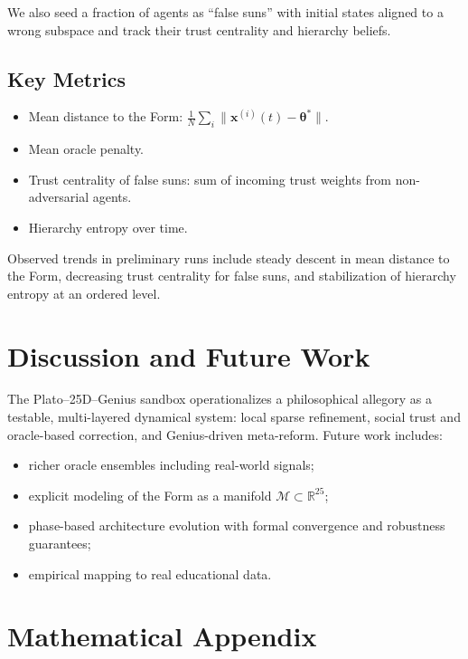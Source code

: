 \documentclass[11pt]{article}
\begin{document}
We also seed a fraction of agents as ``false suns'' with initial states
aligned to a wrong subspace and track their trust centrality and
hierarchy beliefs.

\subsection{Key Metrics}

\begin{itemize}[noitemsep]
  \item Mean distance to the Form:
    \(
      \frac{1}{N}\sum_i \| \bm{x}^{(i)}(t) - \bm{\theta}^* \|.
    \)
  \item Mean oracle penalty.
  \item Trust centrality of false suns:
    sum of incoming trust weights from non-adversarial agents.
  \item Hierarchy entropy over time.
\end{itemize}

Observed trends in preliminary runs include steady descent in mean
distance to the Form, decreasing trust centrality for false suns, and
stabilization of hierarchy entropy at an ordered level.

\section{Discussion and Future Work}

The Plato--25D--Genius sandbox operationalizes a philosophical allegory
as a testable, multi-layered dynamical system:
local sparse refinement, social trust and oracle-based correction,
and Genius-driven meta-reform.
Future work includes:
\begin{itemize}[noitemsep]
  \item richer oracle ensembles including real-world signals;
  \item explicit modeling of the Form as a manifold
        $\mathcal{M} \subset \mathbb{R}^{25}$;
  \item phase-based architecture evolution with formal convergence and
        robustness guarantees;
  \item empirical mapping to real educational data.
\end{itemize}


\appendix
\section{Mathematical Appendix}
\end{document}
